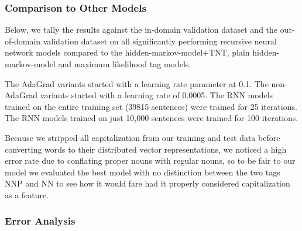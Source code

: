 \documentclass[11pt]{article}
\begin{document}
\subsubsection{Comparison to Other Models}

Below, we tally the results against the in-domain validation dataset and the out-of-domain validation dataset on all significantly performing recursive neural network models compared to the hidden-markov-model+TNT, plain hidden-markov-model and maximum likelihood tag models.

The AdaGrad variants started with a learning rate parameter at 0.1. The non-AdaGrad variants started with a learning rate of 0.0005. The RNN models trained on the entire training set (39815 sentences) were trained for 25 iterations. The RNN models trained on just 10,000 sentences were trained for 100 iterations.

Because we stripped all capitalization from our training and test data before converting words to their distributed vector representations, we noticed a high error rate due to conflating proper nouns with regular nouns, so to be fair to our model we evaluated the best model with no distinction between the two tags NNP and NN to see how it would fare had it properly considered capitalization as a feature.

\begin{center}
\end{center}

\subsubsection{Error Analysis}  \label{sec:confm}
\end{document}
